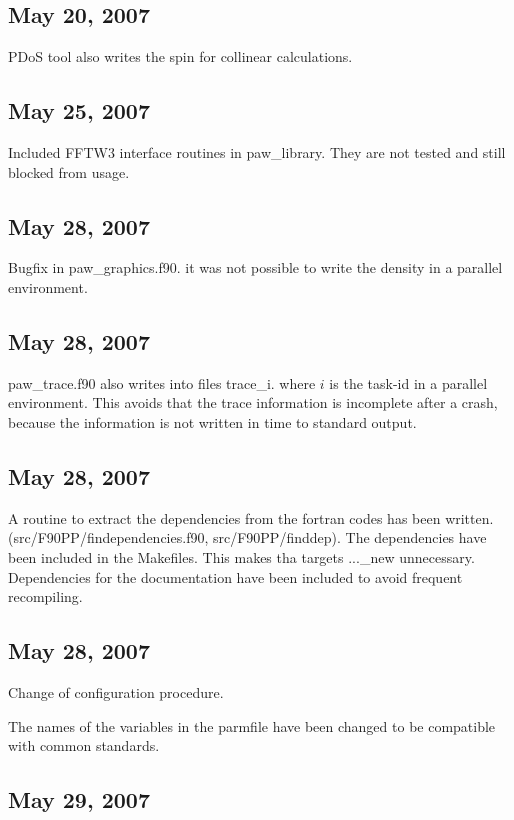 \documentclass[final,12pt]{article}
\begin{document}
\subsection{May 20,  2007}

PDoS tool also writes the spin for collinear calculations.

\subsection{May 25,  2007}

Included FFTW3 interface routines in paw\_library. They are not tested
and still blocked from usage.

\subsection{May 28,  2007}

Bugfix in paw\_graphics.f90. it was not possible to write the density
in a parallel environment.

\subsection{May 28,  2007}

paw\_trace.f90 also writes into files trace\_i. where $i$ is the
task-id in a parallel environment. This avoids that the trace
information is incomplete after a crash, because the information is
not written in time to standard output.

\subsection{May 28,  2007}
 
A routine to extract the dependencies from the fortran codes has been
written. (src/F90PP/findependencies.f90, src/F90PP/finddep). The
dependencies have been included in the Makefiles. This makes tha
targets ...\_new unnecessary. Dependencies for the documentation have
been included to avoid frequent recompiling.

\subsection{May 28,  2007}

Change of configuration procedure.

The names of the variables in the parmfile have been changed to be
compatible with common standards.

\subsection{May 29,  2007}
\end{document}
